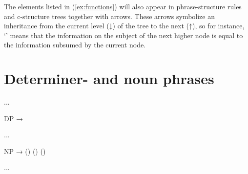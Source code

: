 The elements listed in (\ref{ex:functions}) will also appear in 
phrase-structure rules and c-structure trees together with arrows. These arrows 
symbolize an inheritance from the current level (↓) of the tree to the next 
(↑), so for instance, `\pass{\Subj}' means that the information on the subject 
of the next higher node is equal to the information subsumed by the current 
node.

\section{Determiner- and noun phrases}

...

\ex\begin{minipage}[t]{.5\linewidth}
DP →  \\
\end{minipage}
\xe

...

\ex\begin{minipage}[t]{.5\linewidth}
NP → ()  () ()
\end{minipage}
\xe

...

%
%
%
%
